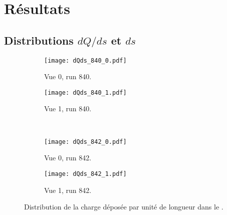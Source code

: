   \section{Résultats}\label{sec::results-311}

    \subsection{Distributions $dQ/ds$ et $ds$}

      \begin{figure}[htbp]
        \centering
        \begin{subfigure}[t]{0.48\textwidth}
          \centering
          \texttt{[image: dQds\_840\_0.pdf]}
          \caption{Vue 0, run 840.}
        \end{subfigure}\hfill
        \begin{subfigure}[t]{0.48\textwidth}
          \centering
          \texttt{[image: dQds\_840\_1.pdf]}
           \caption{Vue 1, run 840.}
        \end{subfigure}\\
        \begin{subfigure}[t]{0.48\textwidth}
          \centering
          \texttt{[image: dQds\_842\_0.pdf]}
          \caption{Vue 0, run 842.}
        \end{subfigure}\hfill
        \begin{subfigure}[t]{0.48\textwidth}
          \centering
          \texttt{[image: dQds\_842\_1.pdf]}
          \caption{Vue 1, run 842.}
        \end{subfigure}
        \caption[Distribution de la charge déposée par unité de longueur dans le \TOO{}]{\label{fig::dqds_840_842}Distribution de la charge déposée par unité de longueur dans le \TOO{}.}
      \end{figure}

